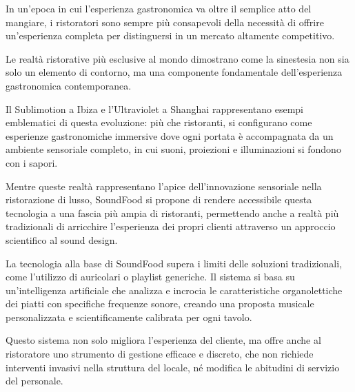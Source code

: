In un'epoca in cui l'esperienza gastronomica va oltre il semplice atto del mangiare, i ristoratori sono sempre più consapevoli della necessità di offrire un'esperienza completa per distinguersi in un mercato altamente competitivo.

Le realtà ristorative più esclusive al mondo dimostrano come la sinestesia non sia solo un elemento di contorno, ma una componente fondamentale dell'esperienza gastronomica contemporanea.

Il Sublimotion a Ibiza e l'Ultraviolet a Shanghai rappresentano esempi emblematici di questa evoluzione: più che ristoranti, si configurano come esperienze gastronomiche immersive dove ogni portata è accompagnata da un ambiente sensoriale completo, in cui suoni, proiezioni e illuminazioni si fondono con i sapori.

Mentre queste realtà rappresentano l'apice dell'innovazione sensoriale nella ristorazione di lusso, SoundFood si propone di rendere accessibile questa tecnologia a una fascia più ampia di ristoranti, permettendo anche a realtà più tradizionali di arricchire l'esperienza dei propri clienti attraverso un approccio scientifico al sound design.

La tecnologia alla base di SoundFood supera i limiti delle soluzioni tradizionali, come l'utilizzo di auricolari o playlist generiche. Il sistema si basa su un'intelligenza artificiale che analizza e incrocia le caratteristiche organolettiche dei piatti con specifiche frequenze sonore, creando una proposta musicale personalizzata e scientificamente calibrata per ogni tavolo.

Questo sistema non solo migliora l'esperienza del cliente, ma offre anche al ristoratore uno strumento di gestione efficace e discreto, che non richiede interventi invasivi nella struttura del locale, né modifica le abitudini di servizio del personale.